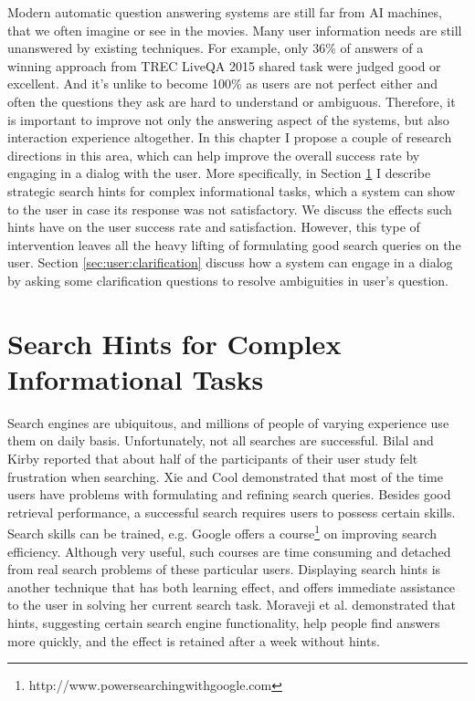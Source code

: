 %

\label{chapter:users}

\noindent

Modern automatic question answering systems are still far from AI machines, that we often imagine or see in the movies.
Many user information needs are still unanswered by existing techniques.
For example, only 36\% of answers of a winning approach from TREC LiveQA 2015 shared task were judged good or excellent.
And it's unlike to become 100\% as users are not perfect either and often the questions they ask are hard to understand or ambiguous.
Therefore, it is important to improve not only the answering aspect of the systems, but also interaction experience altogether.
In this chapter I propose a couple of research directions in this area, which can help improve the overall success rate by engaging in a dialog with the user.
More specifically, in Section \ref{sec:user:hints} I describe strategic search hints for complex informational tasks, which a system can show to the user in case its response was not satisfactory.
We discuss the effects such hints have on the user success rate and satisfaction.
However, this type of intervention leaves all the heavy lifting of formulating good search queries on the user.
Section \ref{sec:user:clarification} discuss how a system can engage in a dialog by asking some clarification questions to resolve ambiguities in user's question.

\section{Search Hints for Complex Informational Tasks}
\label{sec:user:hints}

Search engines are ubiquitous, and millions of people of varying experience use them on daily basis.
Unfortunately, not all searches are successful.
Bilal and Kirby \cite{Bilal:2002:DSI:637512.637516} reported that about half of the participants of their user study felt frustration when searching.
Xie and Cool \cite{xie2009understanding} demonstrated that most of the time users have problems with formulating and refining search queries.
Besides good retrieval performance, a successful search requires users to possess certain skills.
Search skills can be trained, e.g. Google offers a course\footnote{http://www.powersearchingwithgoogle.com} on improving search efficiency.
Although very useful, such courses are time consuming and detached from real search problems of these particular users.
Displaying search hints is another technique that has both learning effect, and offers immediate assistance to the user in solving her current search task.
Moraveji et al. \cite{Moraveji:2011:MIU:2009916.2009966} demonstrated that hints, suggesting certain search engine functionality, help people find answers more quickly, and the effect is retained after a week without hints.


